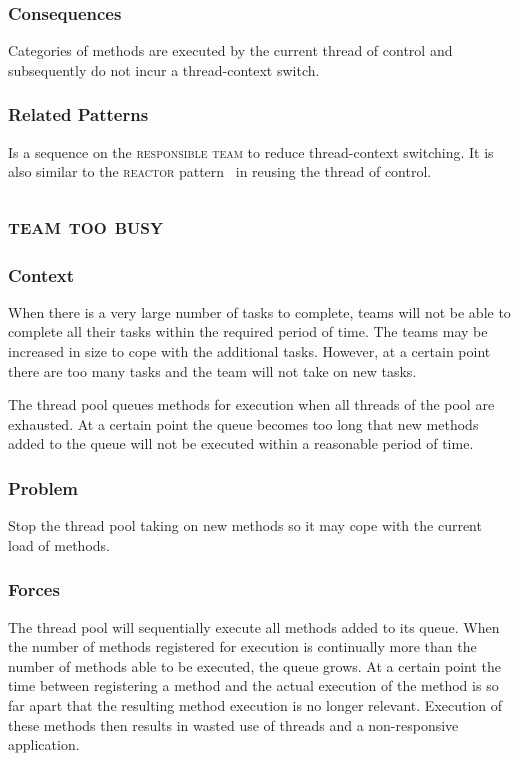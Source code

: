 \documentclass[prodmode]{style/acmlarge}
\begin{document}
\subsubsection*{Consequences} Categories of methods are executed by the current
thread of control and subsequently do not incur a thread-context switch.

\subsubsection*{Related Patterns} Is a sequence on the \textsc{responsible team}
to reduce thread-context switching.  It is also similar to the \textsc{reactor}
pattern~\cite{reactor} in reusing the thread of control.



\subsection{\textsc{\textbf{team too busy}}}

\subsubsection*{Context} When there is a very large number of tasks to complete,
teams will not be able to complete all their tasks within the required period of
time.  The teams may be increased in size to cope with the additional tasks.
However, at a certain point there are too many tasks and the team will not take
on new tasks.

The thread pool queues methods for execution when all threads of the pool are
exhausted.  At a certain point the queue becomes too long that new methods added
to the queue will not be executed within a reasonable period of time.

\subsubsection*{Problem} Stop the thread pool taking on new methods so it may
cope with the current load of methods.

\subsubsection*{Forces} The thread pool will sequentially execute all methods
added to its queue.  When the number of methods registered for execution is
continually more than the number of methods able to be executed, the queue
grows.  At a certain point the time between registering a method and the actual
execution of the method is so far apart that the resulting method execution is
no longer relevant.  Execution of these methods then results in wasted use of
threads and a non-responsive application.
\end{document}
